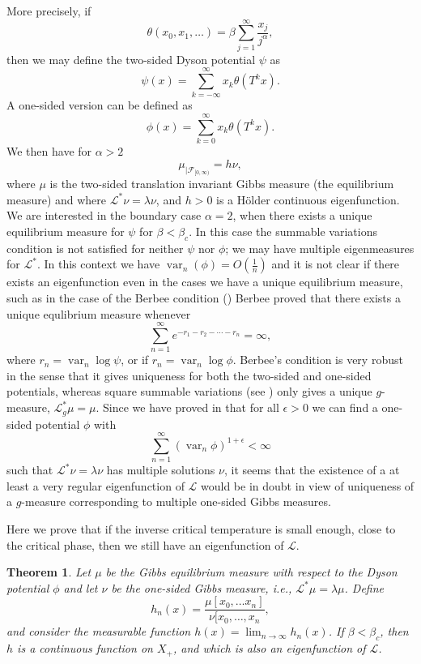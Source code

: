 \documentclass[11pt, a4paper, oneside]{scrartcl}
\newtheorem{thm}{Theorem}
\theoremstyle{definition}
\theoremstyle{remark}
\providecommand{\opn}{\operatorname}
\providecommand{\var}{\opn{var}}
\begin{document}
More precisely, if
$$\theta(x_0, x_1,\ldots)=\beta \sum_{j=1}^\infty \frac{x_j}{j^\alpha},$$
then we may define the two-sided Dyson potential $\psi$ as
$$\psi(x)=\sum_{k=-\infty}^\infty x_k \theta(T^k x).$$
A one-sided version can be defined as
$$\phi(x)=\sum_{k=0}^\infty x_k \theta (T^k x).$$
We then have for $\alpha>2$
$$\mu_{|{\mathcal F}_{[0,\infty)}}= h\nu,$$
where $\mu$ is the two-sided translation invariant Gibbs measure (the
equilibrium measure) and where ${\mathcal L}^*\nu=\lambda \nu$, and $h>0$ is a
H\"older continuous eigenfunction. We are interested in the boundary case
$\alpha=2$, when there exists a unique equilibrium measure for $\psi$ for
$\beta<\beta_c$. In this case the summable variations condition is not satisfied
for neither $\psi$ nor $\phi$; we may have multiple eigenmeasures for
${\mathcal L}^*$. In this context we have $\var_n(\phi)=O(\frac{1}{n})$ and it
is not clear if there exists an eigenfunction even in the cases we have a unique
equilibrium measure, such as in the case of the Berbee condition
(\cite{berbeeUniquenessGibbsMeasures1989}) Berbee proved that there exists a
unique equlibrium measure whenever
\begin{equation}\label{berbee}
  \sum_{n=1}^\infty e^{-r_1-r_2-\cdots-r_n}=\infty,
\end{equation}
where $r_n=\var_n \log \psi$, or if $r_n=\var_n \log \phi$. Berbee's condition
is very robust in the sense that it gives uniqueness for both the two-sided and
one-sided potentials, whereas square summable variations (see
\cite{johanssonSquareSummabilityVariations2003}) only gives a unique
$g$-measure, ${\mathcal L}_g^* \mu=\mu$. Since we have proved in
\cite{johanssonPhaseTransitionsLongrange2017}
that for all $\epsilon>0$ we can find a one-sided potential $\phi$ with
$$\sum_{n=1}^\infty (\var_n \phi)^{1+\epsilon}<\infty$$
such that ${\mathcal L}^* \nu=\lambda \nu$ has multiple solutions $\nu$, it
seems that the existence of a at least a very regular eigenfunction of
${\mathcal L}$ would be in doubt in view of uniqueness of a $g$-measure
corresponding to multiple one-sided Gibbs measures.

Here we prove that if the inverse critical temperature is small enough, close to
the critical phase, then we still have an eigenfunction of ${\mathcal L}$.

\begin{thm}\label{main} Let $\mu$ be the Gibbs equilibrium measure with respect
to the Dyson potential $\phi$ and let $\nu$ be the one-sided Gibbs measure,
i.e., ${\mathcal L}^*\mu=\lambda \mu$. Define
$$h_n(x)=\frac{\mu[x_0,\ldots x_n]}{\nu[x_0,\ldots, x_n},$$
and consider the measurable function $h(x)=\lim_{n\to \infty}h_n(x)$. If
$\beta<\beta_c$, then $h$ is a continuous function on $X_+$, and which is also
an eigenfunction of ${\mathcal L}$.
\end{thm}
\end{document}
